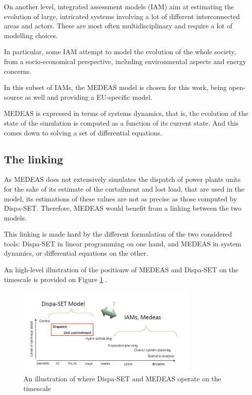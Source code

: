 On another level, integrated assessment models (IAM) aim at estimating the evolution of large, intricated systems involving a lot of different interconnected areas and actors. These are most often multidisciplinary and require a lot of modelling choices.

In particular, some IAM attempt to model the evolution of the whole society, from a socio-economical perspective, including environmental aspects and energy concerns.

In this subset of IAMs, the MEDEAS model is chosen for this work, being open-source as well and providing a EU-specific model.

MEDEAS is expressed in terms of systems dynamics, that is, the evolution of the state of the simulation is computed as a function of its current state. And this comes down to solving a set of differential equations.

\subsection{The linking}

As MEDEAS does not extensively simulates the dispatch of power plants units for the sake of its estimate of the curtailment and lost load, that are used in the model, its estimations of these values are not as precise as those computed by Dispa-SET. Therefore, MEDEAS would benefit from a linking between the two models.

This linking is made hard by the different formulation of the two considered tools: Dispa-SET in linear programming on one hand, and MEDEAS in system dynamics, or differential equations on the other.

An high-level illustration of the positionw of MEDEAS and Dispa-SET on the timescale is provided on Figure \ref{fig:dispaset-medeas-timescale} \cite{dispaset}.

\begin{figure}[h]
    \centering
    \includegraphics[width=0.8\textwidth]{resources/images/dispaset-medeas-timescale.png}
    \caption{An illustration of where Dispa-SET and MEDEAS operate on the timescale}
    \label{fig:dispaset-medeas-timescale}
\end{figure}

